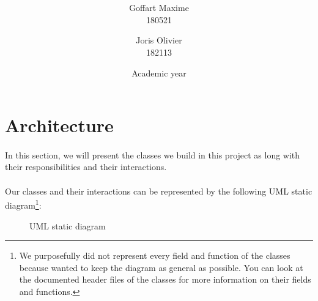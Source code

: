\documentclass[a4paper, 11pt, oneside]{article}
\title{\ClassName\\\vspace*{0.8cm}\ProjectName\vspace{0.8cm}}
\author{Goffart Maxime \\180521 \and Joris Olivier \\ 182113}
\date{\vspace{1cm}Academic year \AcademicYear}
\begin{document}
\begin{titlingpage}
{\let\newpage\relax\maketitle}
\end{titlingpage}


\section{Architecture}
\paragraph{}In this section, we will present the classes we build in this project as long with their responsibilities and their interactions.
\paragraph{}Our classes and their interactions can be represented by the following UML static diagram\footnote{We purposefully did not represent every field and function of the classes because wanted to keep the diagram as general as possible. You can look at the documented header files of the classes for more information on their fields and functions.}:
\begin{figure}[ht!]
  \caption{UML static diagram}
\end{figure}
\end{document}
